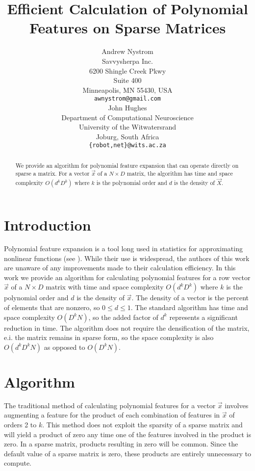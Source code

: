 \documentclass{article} %
\title{Efficient Calculation of Polynomial Features on Sparse Matrices}
\author{Andrew Nystrom \\
Savvysherpa Inc.\\
6200 Shingle Creek Pkwy \\
Suite 400 \\
Minneapolis, MN 55430, USA \\
\texttt{awnystrom@gmail.com} \\
\And
John Hughes \\
Department of Computational Neuroscience \\
University of the Witwatersrand \\
Joburg, South Africa \\
\texttt{\{robot,net\}@wits.ac.za} \\
}
\begin{document}
\maketitle

\begin{abstract}
We provide an algorithm for polynomial feature expansion that can operate directly on sparse a
matrix. For a vector $\vec{x}$ of a $N \times D$ matrix, the algorithm has time and space complexity $O(d^kD^k)$ where $k$ is the polynomial order and $d$ is the density of $\vec{X}$.

\end{abstract}

\section{Introduction}

Polynomial feature expansion is a tool long used in statistics for approximating nonlinear functions (see \cite{gergonne1974application, smith1918standard}).
While their use is widespread, the authors of this work are unaware of any improvements made to their calculation efficiency.
In this work we provide an algorithm for calculating polynomial features for a row vector $\vec{x}$ of a $N \times D$ matrix with time and space complexity $O(d^kD^k)$ where $k$ is the polynomial order and $d$ is the density of $\vec{x}$.
The density of a vector is the percent of elements that are nonzero, so $0 \le d \le 1$.
The standard algorithm has time and space complexity $O(D^kN)$, so the added factor of $d^k$ represents a significant reduction in time.
The algorithm does not require the densification of the matrix, e.i. the matrix remains in sparse form, so the space complexity is also $O(d^kD^kN)$ as opposed to $O(D^kN)$.

\section{Algorithm}
The traditional method of calculating polynomial features for a vector $\vec{x}$ involves augmenting a feature for the product of each combination of features in $\vec{x}$ of orders 2 to $k$.
This method does not exploit the sparsity of a sparse matrix and will yield a product of zero any time one of the features involved in the product is zero.
In a sparse matrix, products resulting in zero will be common.
Since the default value of a sparse matrix is zero, these products are entirely unnecessary to compute.
\end{document}
